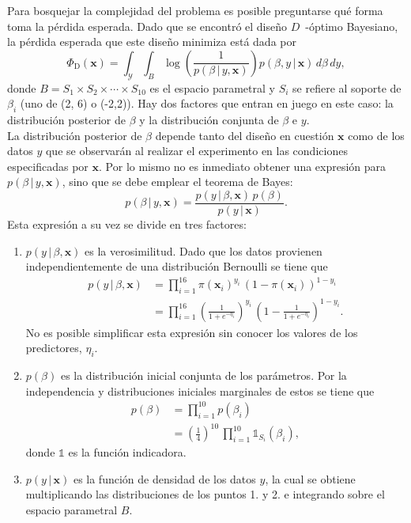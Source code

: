 Para bosquejar la complejidad del problema es posible preguntarse qué forma toma la pérdida esperada. Dado que se encontró el diseño $D$~-óptimo Bayesiano, la pérdida esperada que este diseño minimiza está dada por
\begin{equation*}
	\Phi_{\text{D}} (\mathbf{x}) = \int_{\mathcal{Y}} \int_{B} \log \left( \frac{1}{p(\beta \, | \, y, \mathbf{x})} \right) p( \beta, y \, | \, \mathbf{x} ) \,d\beta \,dy,
\end{equation*}
donde $B = S_1 \times S_2 \times \cdots \times S_{10}$ es el espacio parametral y $S_i$ se refiere al soporte de $\beta_i$ (uno de (2, 6) o (-2,2)). Hay dos factores que entran en juego en este caso: la distribución posterior de $\beta$ y la distribución conjunta de $\beta$ e $y$. \\

La distribución posterior de $\beta$ depende tanto del diseño en cuestión $\mathbf{x}$ como de los datos $y$ que se observarán al realizar el experimento en las condiciones especificadas por $\mathbf{x}$. Por lo mismo no es inmediato obtener una expresión para $p(\beta \, | \, y, \mathbf{x})$, sino que se debe emplear el teorema de Bayes:
\begin{equation*}
	p(\beta \, | \, y, \mathbf{x}) = \frac{p(y \, | \, \beta, \mathbf{x}) \, p(\beta)}{p(y \, | \, \mathbf{x})}.
\end{equation*}
Esta expresión a su vez se divide en tres factores:
\begin{enumerate}
	\item $p(y \, | \, \beta, \mathbf{x})$ es la verosimilitud. Dado que los datos provienen independientemente de una distribución Bernoulli se tiene que
    \begin{align*}
    	p(y \, | \, \beta, \mathbf{x}) &= \prod_{i=1}^{16} \pi(\mathbf{x}_i)^{y_i} \, (1 - \pi(\mathbf{x}_i))^{1 - y_i} \\
        &= \prod_{i=1}^{16} \left( \frac{1}{1 + e^{-\eta_i}} \right)^{y_i} \, \left(1 - \frac{1}{1 + e^{-\eta_i}}  \right)^{1 - y_i}.
    \end{align*}
    No es posible simplificar esta expresión sin conocer los valores de los predictores, $\eta_i$.
    \item $p(\beta)$ es la distribución inicial conjunta de los parámetros. Por la independencia y distribuciones iniciales marginales de estos se tiene que
    \begin{align*}
    	p(\beta) &= \prod_{i=1}^{10} p(\beta_i) \\
        		 &= \left( \frac{1}{4} \right)^{10} \, \prod_{i=1}^{10} \mathds{1}_{S_i}(\beta_i),
    \end{align*}
    donde $\mathds{1}$ es la función indicadora.
    \item $p(y \, | \, \mathbf{x})$ es la función de densidad de los datos $y$, la cual se obtiene multiplicando las distribuciones de los puntos 1. y 2. e integrando sobre el espacio parametral $B$.
\end{enumerate}


